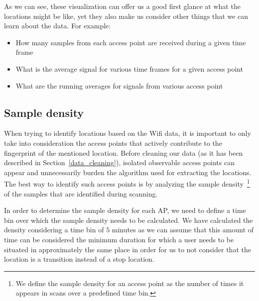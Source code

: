 As we can see, these visualization can offer us a good first glance at what the
locations might be like, yet they also make us consider other things that we can
learn about the data. For example:
\begin{itemize}
  \item How many samples from each access point are received during a given time
  frame
  \item What is the average signal for various time frames for a given access
  point
  \item What are the running averages for signals from various access point
\end{itemize}

\subsection{Sample density}

When trying to identify locations based on the Wifi data, it is important to
only take into consideration the access points that actively contribute to the
fingerprint of the mentioned location. Before cleaning our data (as it has been
described in Section~\ref{data_cleaning}), isolated observable access points can
appear and unnecessarily burden the algorithm used for extracting the locations.
The best way to identify such access points is by analyzing the sample
density~\footnote{We define the sample density for an access point as the number
of times it appears in scans over a predefined time bin.} of the samples that
are identified during scanning.

In order to determine the sample density for each AP, we need to define a time
bin over which the sample density needs to be calculated. We have calculated the
density considering a time bin of $5$ minutes as we can assume that this amount
of time can be considered the minimum duration for which a user needs to be
situated in approximately the same place in order for us to not consider that
the location is a transition instead of a stop location.%

